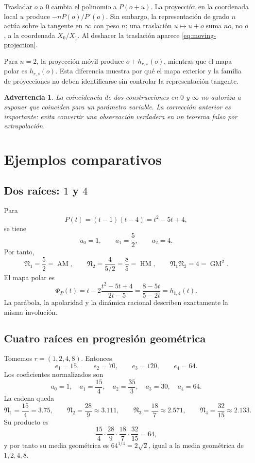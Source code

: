 \documentclass[11pt,oneside]{scrartcl}
\theoremstyle{plainblue}
\theoremstyle{definitionblue}
\theoremstyle{remarkgray}
\newtheorem{warning}[theorem]{Advertencia}
\newcommand{\AM}{\operatorname{AM}}
\newcommand{\GM}{\operatorname{GM}}
\newcommand{\HM}{\operatorname{HM}}
\newcommand{\cN}{\mathfrak{N}}
\begin{document}
\begin{proofmap}
Trasladar \(o\) a \(0\) cambia el polinomio a \(P(o+u)\). La proyección en la
coordenada local \(u\) produce \(-nP(o)/P'(o)\). Sin embargo, la representación de
grado \(n\) actúa sobre la tangente en \(\infty\) con peso \(n\): una traslación
\(u\mapsto u+o\) suma \(no\), no \(o\), a la coordenada \(X_0/X_1\). Al deshacer la
traslación aparece \cref{eq:moving-projection}.
\end{proofmap}

Para \(n=2\), la proyección móvil produce \(o+h_{r,s}(o)\), mientras que el mapa
polar es \(h_{r,s}(o)\). Esta diferencia muestra por qué el mapa exterior y la familia
de proyecciones no deben identificarse sin controlar la representación tangente.

\begin{warning}
La coincidencia de dos construcciones en \(0\) y \(\infty\) no autoriza a suponer que
coinciden para un parámetro variable. La corrección anterior es importante: evita
convertir una observación verdadera en un teorema falso por extrapolación.
\end{warning}

\section{Ejemplos comparativos}

\subsection[Dos raíces: 1 y 4]{Dos raíces: \(1\) y \(4\)}

Para
\[
P(t)=(t-1)(t-4)=t^2-5t+4,
\]
se tiene
\[
a_0=1,
\qquad a_1=\frac52,
\qquad a_2=4.
\]
Por tanto,
\[
\cN_1=\frac52=\AM,
\qquad
\cN_2=\frac{4}{5/2}=\frac85=\HM,
\qquad
\cN_1\cN_2=4=\GM^2.
\]
El mapa polar es
\[
\Phi_P(t)=t-2\frac{t^2-5t+4}{2t-5}
=\frac{8-5t}{5-2t}=h_{1,4}(t).
\]
La parábola, la apolaridad y la dinámica racional describen exactamente la misma
involución.

\subsection{Cuatro raíces en progresión geométrica}

Tomemos \(r=(1,2,4,8)\). Entonces
\[
e_1=15,
\qquad e_2=70,
\qquad e_3=120,
\qquad e_4=64.
\]
Los coeficientes normalizados son
\[
a_0=1,
\quad a_1=\frac{15}{4},
\quad a_2=\frac{35}{3},
\quad a_3=30,
\quad a_4=64.
\]
La cadena queda
\[
\cN_1=\frac{15}{4}=3.75,
\qquad
\cN_2=\frac{28}{9}\approx3.111,
\qquad
\cN_3=\frac{18}{7}\approx2.571,
\qquad
\cN_4=\frac{32}{15}\approx2.133.
\]
Su producto es
\[
\frac{15}{4}\cdot\frac{28}{9}\cdot\frac{18}{7}\cdot\frac{32}{15}=64,
\]
y por tanto su media geométrica es \(64^{1/4}=2\sqrt2\), igual a la media geométrica
de \(1,2,4,8\).
\end{document}

